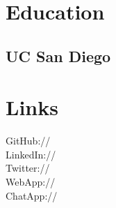 \documentclass[]{deedy-resume-openfont}
\begin{document}
%
%
\lastupdated

%
%



%
%

\begin{minipage}[t]{0.33\textwidth}


\section{Education}

\subsection{UC San Diego}
\sectionsep


\section{Links}
GitHub://\href{https://github.com/jonwho}{} \\
LinkedIn://\href{https://www.linkedin.com/in/jonwho}{} \\
Twitter://\href{https://twitter.com/lj080805}{} \\
WebApp://\href{https://cse134bteam3-hw5.firebaseapp.com/}{} \\
ChatApp://\href{https://playwithfire.firebaseapp.com/}{}
\sectionsep



\end{minipage}
\end{document}

